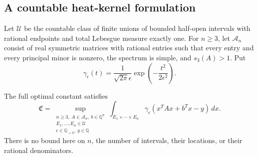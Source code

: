 \subsection{A countable heat-kernel formulation}

Let $\mathcal U$ be the countable class of finite unions of
bounded half-open intervals with rational endpoints and
total Lebesgue measure exactly one.
For $n\geq3$, let $\mathcal A_n$ consist of real symmetric
matrices with rational entries such that every entry and
every principal minor is nonzero, the spectrum is simple,
and $s_3(A)>1$.
Put
\[
 \gamma_\epsilon(t)=
    \frac{1}{\sqrt{2\pi}\epsilon}
                 \exp\left(-\frac{t^2}{2\epsilon^2}\right).
\]

\begin{theorem}\label{fg:countable-heat}
The full optimal constant satisfies
\begin{equation}\label{fg:countable-heat-eq}
 \mathfrak C=
 \sup_{\substack{
       n\geq3,\ A\in\mathcal A_n,\ b\in\mathbb Q^n\\
       E_1,\ldots,E_n\in\mathcal U\\
       \epsilon\in\mathbb Q_{>0},\ y\in\mathbb Q}}
 \int_{E_1\times\cdots\times E_n}
       \gamma_\epsilon(x^TAx+b^Tx-y)\,dx .
\end{equation}
There is no bound here on $n$, the number of intervals,
their locations, or their rational denominators.
\end{theorem}

